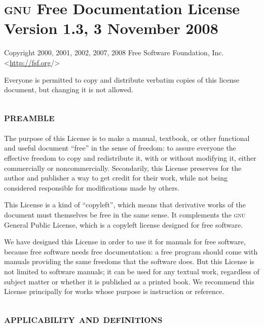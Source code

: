 \chapter[GNU Free Documentation License]{\centering\textsc{gnu}
Free Documentation License\\{\normalsize Version 1.3, 3 November
2008}}\label{chap:license}

Copyright \textcopyright{} 2000, 2001, 2002, 2007, 2008 Free Software
Foundation, Inc.  <\url{http://fsf.org}/>\bigskip

Everyone is permitted to copy and distribute verbatim copies of this
license document, but changing it is not allowed.

\setcounter{section}{-1}

\section[Preamble]{\scshape preamble}

The purpose of this License is to make a manual, textbook, or other
functional and useful document ``free'' in the sense of freedom: to assure
everyone the effective freedom to copy and redistribute it, with or without
modifying it, either commercially or noncommercially. Secondarily, this
License preserves for the author and publisher a way to get credit for
their work, while not being considered responsible for modifications made
by others.

This License is a kind of ``copyleft'', which means that derivative works
of the document must themselves be free in the same sense. It complements
the \textsc{gnu} General Public License, which is a copyleft license
designed for free software.

We have designed this License in order to use it for manuals for free
software, because free software needs free documentation: a free program
should come with manuals providing the same freedoms that the software
does. But this License is not limited to software manuals; it can be used
for any textual work, regardless of subject matter or whether it is
published as a printed book. We recommend this License principally for
works whose purpose is instruction or reference.


\section[Applicability and definitions]{\scshape applicability and
definitions}\label{sec:aptadef}

